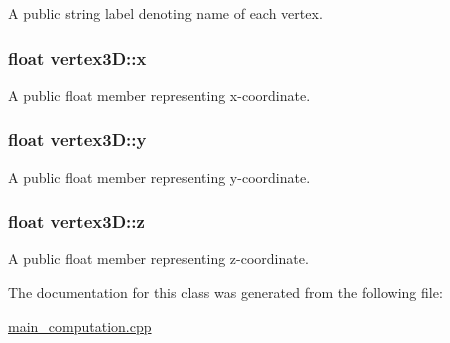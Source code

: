 A public string label denoting name of each vertex. 

\subsubsection[{\texorpdfstring{x}{x}}]{\setlength{\rightskip}{0pt plus 5cm}float vertex3\+D\+::x}\hypertarget{classvertex3D_a6c6ee4315d72adbc5abb17e6af802087}{}\label{classvertex3D_a6c6ee4315d72adbc5abb17e6af802087}


A public float member representing x-\/coordinate. 

\subsubsection[{\texorpdfstring{y}{y}}]{\setlength{\rightskip}{0pt plus 5cm}float vertex3\+D\+::y}\hypertarget{classvertex3D_aa1f4823bf2a3f648b1b0b39ef7ea5891}{}\label{classvertex3D_aa1f4823bf2a3f648b1b0b39ef7ea5891}


A public float member representing y-\/coordinate. 

\subsubsection[{\texorpdfstring{z}{z}}]{\setlength{\rightskip}{0pt plus 5cm}float vertex3\+D\+::z}\hypertarget{classvertex3D_a67f3819dff895cb47284c34ec85658d7}{}\label{classvertex3D_a67f3819dff895cb47284c34ec85658d7}


A public float member representing z-\/coordinate. 



The documentation for this class was generated from the following file\+:\begin{DoxyCompactItemize}
\item 
\hyperlink{main__computation_8cpp}{main\+\_\+computation.\+cpp}\end{DoxyCompactItemize}
